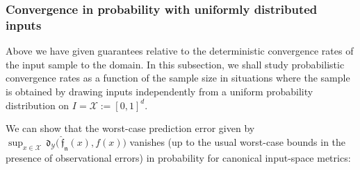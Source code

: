 \documentclass{article} %
\newtheorem{lem}[thm]{Lemma}
\theoremstyle{definition}
\theoremstyle{remark}
\newcommand{\norm}[1]{\left\Vert#1\right\Vert}
\newcommand{\nat}{\mathbb N}
\newcommand{\vc}[1]{#1}
\newcommand{\ball}[2]{\ensuremath{\mathfrak B_{\vc{#1}} \bigl( #2\bigr) }}
\renewcommand{\d}[1]{\text{ d}#1}
\newcommand{\inspace}{\ensuremath{ \mathcal X}}
\newcommand{\outspace}{\ensuremath{ \mathcal Y}}
\newcommand{\grid}{\ensuremath{  G}}
\newcommand{\metric}{\, \mathfrak{d}} %
\newcommand{\Metrico}[2]{\metric_\outspace\bigl(#1,#2\bigr) }
\newcommand{\predfn}{\, \mathfrak{  \hat f_n}} %
\newcommand{\indicator}[1]{\ensuremath{\textbf{1}_{#1}}} %
\newcommand{\seq}[2]{\ensuremath{\bigl(#1\bigr)_{#2}}}
\renewcommand{\Pr}{\mathrm{Pr}}
\renewcommand{\d}{\ensuremath{\text{ d}}}
\begin{document}
\subsubsection{Convergence in probability with uniformly distributed inputs}
\label{sec:probconv_LACKI}
Above we have given guarantees relative to the deterministic convergence rates of the input sample to the domain.
In this subsection, we shall study probabilistic convergence rates as a function of the sample size in situations where the sample is obtained by drawing inputs independently from a uniform probability distribution on $I=\inspace := [0,1]^d$. 

We can show that the worst-case prediction error given by $\sup_{x \in \inspace}\Metrico{\predfn(x)}{ f(x)}$ vanishes (up to the usual worst-case bounds in the presence of observational errors) in probability for canonical input-space metrics:  

%
%
\end{document}
